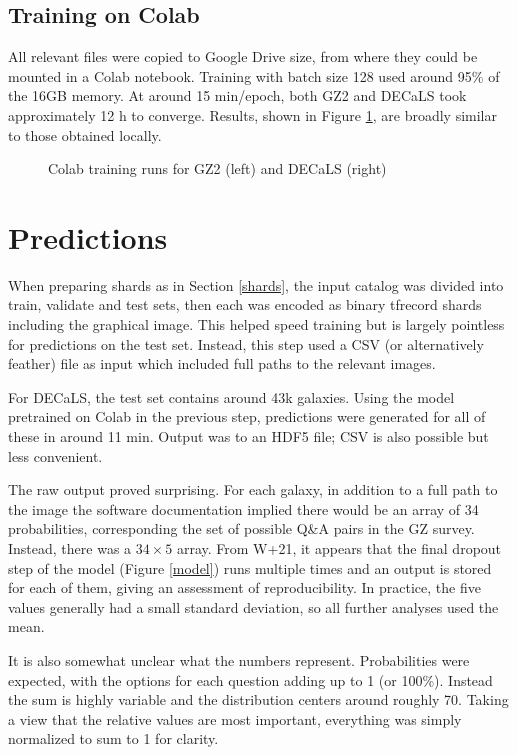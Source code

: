\documentclass[preprint]{aastex631}
\newcommand{\todo}{\color{red}{TODO}\color{black}\hspace{2mm}}
\begin{document}
\subsection{Training on Colab} \label{sec:colabtrain}

All relevant files were copied to Google Drive \todo size, from where they could be mounted in a Colab notebook. Training with batch size 128 used around 95\% of the 16GB memory. At around 15 min/epoch, both GZ2 and DECaLS took approximately 12 h to converge. Results, shown in Figure \ref{fig:train_colab}, are broadly similar to those obtained locally.

\begin{figure}
	\caption{Colab training runs for GZ2 (left) and DECaLS (right) \label{fig:train_colab}}
\end{figure}


\section{Predictions} \label{sec:predictions}

When preparing shards as in Section \ref{shards}, the input catalog was divided into train, validate and test sets, then each was encoded as binary tfrecord shards including the graphical image. This helped speed training but is largely pointless for predictions on the test set. Instead, this step used a CSV (or alternatively feather) file as input which included full paths to the relevant images.

For DECaLS, the test set contains around 43k galaxies. Using the model pretrained on Colab in the previous step, predictions were generated for all of these in around 11 min. Output was to an HDF5 file; CSV is also possible but less convenient.

The raw output proved surprising. For each galaxy, in addition to a full path to the image the software documentation implied there would be an array of 34 probabilities, corresponding the set of possible Q\&A pairs in the GZ survey. Instead, there was a $34 \times 5$ array. From W+21, it appears that the final dropout step of the model (Figure \ref{model}) runs multiple times and an output is stored for each of them, giving an assessment of reproducibility. In practice, the five values generally had a small standard deviation, so all further analyses used the mean.

It is also somewhat unclear what the numbers represent. Probabilities were expected, with the options for each question adding up to 1 (or  100\%). Instead the sum is highly variable and the distribution centers around roughly 70. Taking a view that the relative values are most important, everything was simply normalized to sum to 1 for clarity. 
\end{document}
